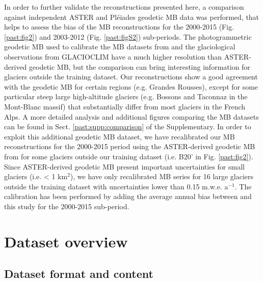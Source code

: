 In order to further validate the reconstructions presented here, a comparison against independent ASTER \citep{davaze_region-wide_2020} and Pléiades \citep{berthier_glacier_2014} geodetic MB data was performed, that helps to assess the bias of the MB reconstructions for the 2000-2015 (Fig. \ref{past:fig2}) and 2003-2012 (Fig. \ref{past:figS2}) sub-periods.  The photogrammetric geodetic MB used to calibrate the MB datasets from \citet{rabatel_spatio-temporal_2016} and the glaciological observations from GLACIOCLIM have a much higher resolution than ASTER-derived geodetic MB, but the comparison can bring interesting information for glaciers outside the training dataset. Our reconstructions show a good agreement with the geodetic MB for certain regions (e.g. Grandes Rousses), except for some particular steep large high-altitude glaciers (e.g. Bossons and Taconnaz in the Mont-Blanc massif) that substantially differ from most glaciers in the French Alps. A more detailed analysis and additional figures comparing the MB datasets can be found in Sect. \ref{past:supp:comparison} of the Supplementary. In order to exploit this additional geodetic MB dataset, we have recalibrated our MB reconstructions for the 2000-2015 period using the ASTER-derived geodetic MB from \citet{davaze_region-wide_2020} for some glaciers outside our training dataset (i.e. B20' in Fig. \ref{past:fig2}). Since ASTER-derived geodetic MB present important uncertainties for small glaciers (i.e. < 1 km$^{2}$), we have only recalibrated MB series for 16 large glaciers outside the training dataset with uncertainties lower than 0.15 m.w.e. a$^{-1}$. The calibration has been performed by adding the average annual bias between \citet{davaze_region-wide_2020} and this study for the 2000-2015 sub-period.


\section{Dataset overview} \label{past:overview}

\subsection{Dataset format and content} \label{past:overview:format}

